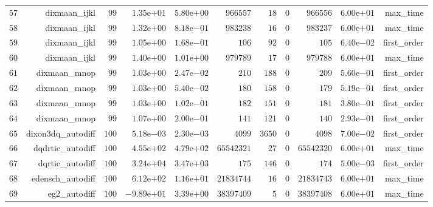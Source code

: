 \documentclass[varwidth=20cm,crop=true]{standalone}
\begin{document}
\begin{longtable}{rrrrrrrrrrr}
  \(    57\) & dixmaan\_ijkl & \(    99\) & \( 1.35\)e\(+01\) & \( 5.80\)e\(+00\) & \(966557\) & \(    18\) & \(     0\) & \(966556\) & \( 6.00\)e\(+01\) & max\_time \\
  \(    58\) & dixmaan\_ijkl & \(    99\) & \( 1.32\)e\(+00\) & \( 8.18\)e\(-01\) & \(983238\) & \(    16\) & \(     0\) & \(983237\) & \( 6.00\)e\(+01\) & max\_time \\
  \(    59\) & dixmaan\_ijkl & \(    99\) & \( 1.05\)e\(+00\) & \( 1.68\)e\(-01\) & \(   106\) & \(    92\) & \(     0\) & \(   105\) & \( 6.40\)e\(-02\) & first\_order \\
  \(    60\) & dixmaan\_ijkl & \(    99\) & \( 1.40\)e\(+00\) & \( 1.01\)e\(+00\) & \(979789\) & \(    17\) & \(     0\) & \(979788\) & \( 6.00\)e\(+01\) & max\_time \\
  \(    61\) & dixmaan\_mnop & \(    99\) & \( 1.03\)e\(+00\) & \( 2.47\)e\(-02\) & \(   210\) & \(   188\) & \(     0\) & \(   209\) & \( 5.60\)e\(-01\) & first\_order \\
  \(    62\) & dixmaan\_mnop & \(    99\) & \( 1.03\)e\(+00\) & \( 5.40\)e\(-02\) & \(   180\) & \(   158\) & \(     0\) & \(   179\) & \( 5.19\)e\(-01\) & first\_order \\
  \(    63\) & dixmaan\_mnop & \(    99\) & \( 1.03\)e\(+00\) & \( 1.02\)e\(-01\) & \(   182\) & \(   151\) & \(     0\) & \(   181\) & \( 3.80\)e\(-01\) & first\_order \\
  \(    64\) & dixmaan\_mnop & \(    99\) & \( 1.07\)e\(+00\) & \( 2.00\)e\(-01\) & \(   141\) & \(   121\) & \(     0\) & \(   140\) & \( 2.93\)e\(-01\) & first\_order \\
  \(    65\) & dixon3dq\_autodiff & \(   100\) & \( 5.18\)e\(-03\) & \( 2.30\)e\(-03\) & \(  4099\) & \(  3650\) & \(     0\) & \(  4098\) & \( 7.00\)e\(-02\) & first\_order \\
  \(    66\) & dqdrtic\_autodiff & \(   100\) & \( 4.55\)e\(+02\) & \( 4.79\)e\(+02\) & \(65542321\) & \(    27\) & \(     0\) & \(65542320\) & \( 6.00\)e\(+01\) & max\_time \\
  \(    67\) & dqrtic\_autodiff & \(   100\) & \( 3.24\)e\(+04\) & \( 3.47\)e\(+03\) & \(   175\) & \(   146\) & \(     0\) & \(   174\) & \( 5.00\)e\(-03\) & first\_order \\
  \(    68\) & edensch\_autodiff & \(   100\) & \( 6.12\)e\(+02\) & \( 1.16\)e\(+01\) & \(21834744\) & \(    16\) & \(     0\) & \(21834743\) & \( 6.00\)e\(+01\) & max\_time \\
  \(    69\) & eg2\_autodiff & \(   100\) & \(-9.89\)e\(+01\) & \( 3.39\)e\(+00\) & \(38397409\) & \(     5\) & \(     0\) & \(38397408\) & \( 6.00\)e\(+01\) & max\_time \\

\end{longtable}
\end{document}
